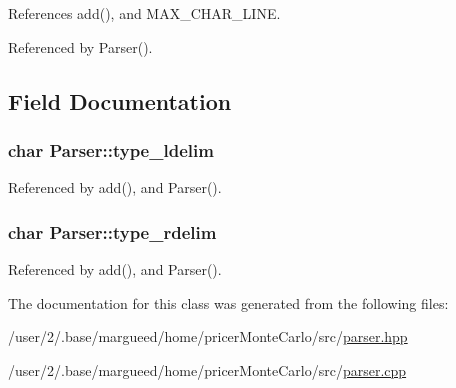 References add(), and M\-A\-X\-\_\-\-C\-H\-A\-R\-\_\-\-L\-I\-N\-E.



Referenced by Parser().



\subsection{Field Documentation}
\hypertarget{classParser_a2b2cf77a6f8a340790e467557cbc5a12}{
\subsubsection[{type\-\_\-ldelim}]{\setlength{\rightskip}{0pt plus 5cm}char Parser\-::type\-\_\-ldelim\hspace{0.3cm}{\ttfamily [private]}}}\label{classParser_a2b2cf77a6f8a340790e467557cbc5a12}


Referenced by add(), and Parser().

\hypertarget{classParser_adfd95f7f5fce9f3d6effd2160ab3b4d3}{
\subsubsection[{type\-\_\-rdelim}]{\setlength{\rightskip}{0pt plus 5cm}char Parser\-::type\-\_\-rdelim\hspace{0.3cm}{\ttfamily [private]}}}\label{classParser_adfd95f7f5fce9f3d6effd2160ab3b4d3}


Referenced by add(), and Parser().



The documentation for this class was generated from the following files\-:\begin{DoxyCompactItemize}
\item 
/user/2/.\-base/margueed/home/pricer\-Monte\-Carlo/src/\hyperlink{parser_8hpp}{parser.\-hpp}\item 
/user/2/.\-base/margueed/home/pricer\-Monte\-Carlo/src/\hyperlink{parser_8cpp}{parser.\-cpp}\end{DoxyCompactItemize}
